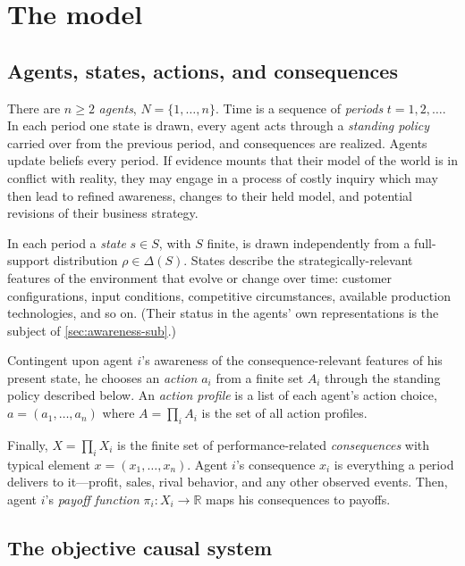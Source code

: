 \documentclass[11pt]{article}
\theoremstyle{definition}
\begin{document}
\section{The model}
\label{sec:model}

\subsection{Agents, states, actions, and consequences}
\label{sec:primitives}

There are $n\ge 2$ \textit{agents}, $N=\{1,\dots,n\}$.
Time is a sequence of \textit{periods} $t=1,2,\dots$.
In each period one state is drawn, every agent acts through a \emph{standing policy} carried over from the previous period, and consequences are realized.
Agents update beliefs every period.
If evidence mounts that their model of the world is in conflict with reality, they may engage in a process of costly inquiry which may then lead to refined awareness, changes to their held model, and potential revisions of their business strategy.


In each period a \textit{state} $s\in S$, with $S$ finite, is drawn independently from a full-support distribution $\rho\in\Delta(S)$.
States describe the strategically-relevant features of the environment that evolve or change over time: customer configurations, input conditions, competitive circumstances, available production technologies, and so on.
(Their status in the agents' own representations is the subject of \cref{sec:awareness-sub}.)

Contingent upon agent \(i\)'s awareness of the consequence-relevant features of his present state, he chooses an \textit{action} $a_i$ from a finite set $A_i$ through the standing policy described below.
An \textit{action profile} is a list of each agent's action choice, $a=(a_1,\ldots,a_n)$ where $A=\prod_iA_i$ is the set of all action profiles.

Finally, $X=\prod_iX_i$ is the finite set of performance-related \textit{consequences} with typical element $x=(x_1,\dots,x_n)$.
Agent $i$'s consequence $x_i$ is everything a period delivers to it---profit, sales, rival behavior, and any other observed events.
Then, agent \(i\)'s \textit{payoff function} $\pi_i:X_i\to\mathbb R$ maps his consequences to payoffs.



\subsection{The objective causal system}
\label{sec:mechanisms-sub}
\end{document}
